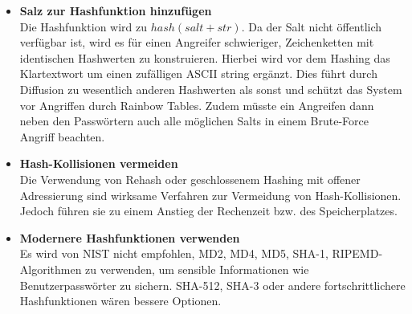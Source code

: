 %
\label{lo:sec_sol}
\begin{itemize}
      \item \textbf{Salz zur Hashfunktion hinzufügen}
            \\
            Die Hashfunktion wird zu $hash(salt + str)$. \cite{kryptografischeHashfunktion}
            Da der Salt nicht öffentlich verfügbar ist, wird es für einen Angreifer schwieriger,
            Zeichenketten mit identischen Hashwerten zu konstruieren.
            Hierbei wird vor dem 
            Hashing das Klartextwort um einen zufälligen ASCII
            string ergänzt. Dies führt durch Diffusion zu wesentlich anderen Hashwerten als sonst 
            und schützt das System vor Angriffen durch Rainbow Tables. 
            Zudem müsste ein Angreifen dann neben den Passwörtern auch alle möglichen Salts 
            in einem Brute-Force Angriff beachten.
      \item \textbf{Hash-Kollisionen vermeiden}
            \\
            Die Verwendung von Rehash oder geschlossenem Hashing mit offener Adressierung
            sind wirksame Verfahren zur Vermeidung von Hash-Kollisionen.\cite{hashtabelle}
            Jedoch führen sie zu einem Anstieg der Rechenzeit bzw. des Speicherplatzes.
      \item \textbf{Modernere Hashfunktionen verwenden}
            \\
            Es wird von NIST nicht empfohlen, MD2, MD4, MD5, SHA-1, RIPEMD-Algorithmen zu verwenden,
            um sensible Informationen wie Benutzerpasswörter zu
            sichern. \cite{barker2020}
            SHA-512, SHA-3 oder andere fortschrittlichere Hashfunktionen 
            wären bessere Optionen.
\end{itemize}